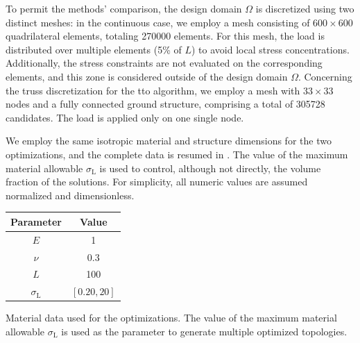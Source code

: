 To permit the methods' comparison, the design domain $\Omega$ is discretized using two distinct meshes: in the continuous case, we employ a mesh consisting of $600\times600$ quadrilateral elements, totaling \num[group-separator={$\,$}]{270000} elements. For this mesh, the load is distributed over multiple elements (5\% of $L$) to avoid local stress concentrations. Additionally, the stress constraints are not evaluated on the corresponding elements, and this zone is considered outside of the design domain $\Omega$. Concerning the truss discretization for the \gls{tto} algorithm, we employ a mesh with $33\times 33$ nodes and a fully connected ground structure, comprising a total of \num[group-separator={$\,$}]{305728} candidates. The load is applied only on one single node.

We employ the same isotropic material and structure dimensions for the two optimizations, and the complete data is resumed in . The value of the maximum material allowable $\sigma_\text{L}$ is used to control, although not directly, the volume fraction of the solutions. For simplicity, all numeric values are assumed normalized and dimensionless.

\begin{margintable}
    \small
    \centering
    \begin{tabular}{cc}
    \toprule
    \textbf{Parameter}        & \textbf{Value} \\ \midrule
    $E$              & 1     \\
    $\nu$            & 0.3   \\
    $L$              & 100   \\
    $\sigma_\text{L}$ & $[0.20,20]$ \\
    \bottomrule
    \end{tabular}
    \caption{Material data used for the optimizations. The value of the maximum material allowable $\sigma_\text{L}$ is used as the parameter to generate multiple optimized topologies.}
    \label{tab:03_mat}
\end{margintable}

